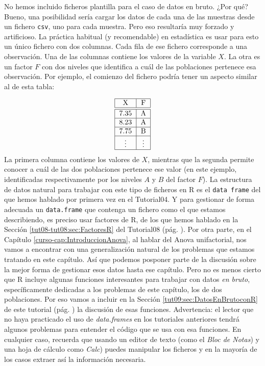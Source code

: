 \documentclass[10pt,a4paper]{article}\usepackage[]{graphicx}\usepackage[]{color}
\newcounter {cont01}
\begin{document}
No hemos incluido ficheros plantilla para el caso de datos en bruto. ¿Por qué? Bueno, una posibilidad sería cargar los datos de cada una de las muestras desde un fichero {\tt csv}, uno para cada muestra. Pero eso resultaría muy forzado y artificioso. La práctica habitual (y recomendable) en estadística es usar para esto un único fichero con dos columnas. Cada fila de ese fichero corresponde a una observación. Una de las columnas contiene los valores de la variable $X$. La otra es un factor $F$ con dos niveles que identifica a cuál de las poblaciones pertenece esa observación. Por ejemplo, el comienzo del fichero podría tener un aspecto similar al de esta tabla:

\[
\begin{tabular}{|c|c|}
  \hline
  X & F \\
  \hline
  \hline
  7.35 & A \\
  \hline
  8.23 & A \\
  \hline
  7.75 & B \\
  \hline
  \vdots & \vdots \\
  \hline
\end{tabular}
\]
La primera columna contiene los valores de $X$, mientras que la segunda permite conocer a cuál de las dos poblaciones pertenece ese valor (en este ejemplo, identificadas respectivamente por los niveles $A$ y $B$ del factor $F$). La estructura de datos natural para trabajar con este tipo de ficheros en R es el {\tt data frame} del que hemos hablado por primera vez en el Tutorial04. Y para gestionar de forma adecuada un {\tt data.frame} que contenga un fichero como el que estamos describiendo, es preciso usar factores de R, de los que hemos hablado en la Sección  \ref{tut08-tut08:sec:FactoresR} del Tutorial08 (pág. \pageref{tut08-tut08:sec:FactoresR}). Por otra parte, en el Capítulo \ref{curso-cap:IntroduccionAnova}, al hablar del Anova unifactorial, nos vamos a encontrar con una generalización natural de los problemas que estamos tratando en este capítulo. Así que podemos posponer parte de la discusión sobre la mejor forma de gestionar esos datos hasta ese capítulo. Pero no es menos cierto que R incluye algunas funciones interesantes para trabajar con datos {\em en bruto}, específicamente dedicadas a los problemas de este capítulo, los de dos poblaciones. Por eso vamos a incluir en la Sección \ref{tut09:sec:DatosEnBrutoconR} de este tutorial (pág. \pageref{tut09:sec:DatosEnBrutoconR}) la discusión de esas funciones. Advertencia: el lector que no haya practicado el uso de {\em data.frames} en los tutoriales anteriores tendrá algunos problemas para entender el código que se usa con esa funciones. En cualquier caso, recuerda que usando un editor de texto (como el {\em Bloc de Notas}) y una hoja de cálculo como {\em Calc}) puedes manipular los ficheros y en la mayoría de los casos extraer así la información necesaria.
\end{document}
